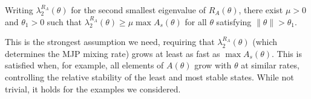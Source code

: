\begin{assumption}
  Writing $\lambda^{R_A}_2(\theta)$ for the second smallest eigenvalue of
    $R_A(\theta)$, there exist $\mu > 0$ and $\theta_1 > 0$
    such that $ \lambda^{R_A}_2(\theta) \geq \mu \max A_s(\theta)$
   for all $\theta$ satisfying $ \| \theta \|> \theta_1$.
  \label{asmp:cond_num}
\end{assumption} 
\noindent %
This is the strongest assumption we need, requiring that 
$\lambda^{R_A}_2(\theta)$ (which determines the MJP mixing rate) grows 
at least as fast as $\max A_s(\theta)$. 
This is satisfied when, for example, all elements of $A(\theta)$ grow 
with $\theta$ at similar rates, controlling the relative stability of 
the least and most stable states.
While not trivial, it holds for the examples we 
considered. %
